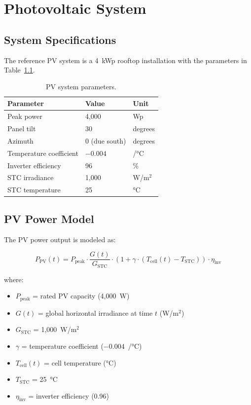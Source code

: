 \chapter{Photovoltaic System}
\label{ch:pv}

\section{System Specifications}

The reference PV system is a 4~kWp rooftop installation with the parameters in Table~\ref{tab:pv_specs}.

\begin{table}[H]
\centering
\caption{PV system parameters.}
\label{tab:pv_specs}
\begin{tabular}{lll}
\toprule
\textbf{Parameter} & \textbf{Value} & \textbf{Unit} \\
\midrule
Peak power & 4,000 & Wp \\
Panel tilt & 30 & degrees \\
Azimuth & 0 (due south) & degrees \\
Temperature coefficient & $-0.004$ & /°C \\
Inverter efficiency & 96 & \% \\
STC irradiance & 1,000 & W/m$^2$ \\
STC temperature & 25 & °C \\
\bottomrule
\end{tabular}
\end{table}

\section{PV Power Model}

The PV power output is modeled as:

\begin{equation}
    P_{\text{PV}}(t) = P_{\text{peak}} \cdot \frac{G(t)}{G_{\text{STC}}} \cdot \left(1 + \gamma \cdot (T_{\text{cell}}(t) - T_{\text{STC}})\right) \cdot \eta_{\text{inv}}
    \label{eq:pv_power}
\end{equation}

where:
\begin{itemize}[nosep]
    \item $P_{\text{peak}}$ = rated PV capacity (4,000~W)
    \item $G(t)$ = global horizontal irradiance at time $t$ (W/m$^2$)
    \item $G_{\text{STC}}$ = 1,000~W/m$^2$
    \item $\gamma$ = temperature coefficient ($-0.004$~/°C)
    \item $T_{\text{cell}}(t)$ = cell temperature (°C)
    \item $T_{\text{STC}}$ = 25~°C
    \item $\eta_{\text{inv}}$ = inverter efficiency (0.96)
\end{itemize}

